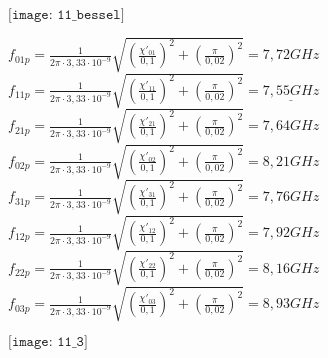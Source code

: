 \begin{solution}
\begin{enumerate}[a)]
    \begin{center}
        $\texttt{[image: 11\_bessel]}$\\
    \end{center}

$f_{01p} = \frac{1}{2\pi \cdot 3,33 \cdot 10^{-9}}\sqrt{(\frac{ \chi'_{01} }{0,1})^2+(\frac{ \pi }{0,02})^2} = 7,72 GHz$\\
$f_{11p} = \frac{1}{2\pi \cdot 3,33 \cdot 10^{-9}}\sqrt{(\frac{ \chi'_{11} }{0,1})^2+(\frac{ \pi }{0,02})^2} = \underline{7,55 GHz}$\\
$f_{21p} = \frac{1}{2\pi \cdot 3,33 \cdot 10^{-9}}\sqrt{(\frac{ \chi'_{21} }{0,1})^2+(\frac{ \pi }{0,02})^2} = 7,64 GHz$\\
$f_{02p} = \frac{1}{2\pi \cdot 3,33 \cdot 10^{-9}}\sqrt{(\frac{ \chi'_{02} }{0,1})^2+(\frac{ \pi }{0,02})^2} = 8,21 GHz$\\
$f_{31p} = \frac{1}{2\pi \cdot 3,33 \cdot 10^{-9}}\sqrt{(\frac{ \chi'_{31} }{0,1})^2+(\frac{ \pi }{0,02})^2} = 7,76 GHz$\\
$f_{12p} = \frac{1}{2\pi \cdot 3,33 \cdot 10^{-9}}\sqrt{(\frac{ \chi'_{12} }{0,1})^2+(\frac{ \pi }{0,02})^2} = 7,92 GHz$\\
$f_{22p} = \frac{1}{2\pi \cdot 3,33 \cdot 10^{-9}}\sqrt{(\frac{ \chi'_{22} }{0,1})^2+(\frac{ \pi }{0,02})^2} = 8,16 GHz$\\
$f_{03p} = \frac{1}{2\pi \cdot 3,33 \cdot 10^{-9}}\sqrt{(\frac{ \chi'_{03} }{0,1})^2+(\frac{ \pi }{0,02})^2} = 8,93 GHz$\\

    \begin{center}
        $\texttt{[image: 11\_3]}$\\
    \end{center}


\end{enumerate}
\end{solution}
